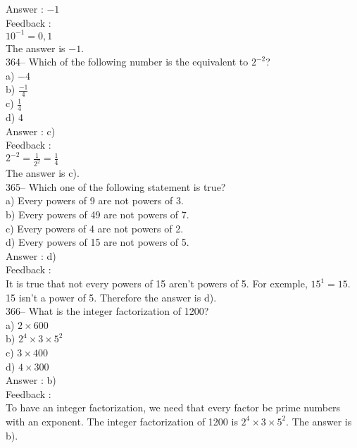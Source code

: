 \documentclass[letterpaper, 12pt]{article}
\begin{document}
Answer : $-1$\\

Feedback : \\
$10^{-1}=0,1$\\
The answer is $-1$.\\

364-- Which of the following number is the equivalent to $2^{-2}$?\\
a) $-4$\\[2mm]
b) $\frac{-1}{4}$\\[2mm]
c) $\frac{1}{4}$\\[2mm]
d) 4\\

Answer : c)\\

Feedback : \\
$2^{-2}=\frac{1}{2^{2}}=\frac{1}{4}$\\[2mm]
The answer is c).\\

365-- Which one of the following statement is true?\\
a) Every powers of 9 are not powers of 3.\\
b) Every powers of 49 are not powers of 7.\\
c) Every powers of 4 are not powers of 2.\\
d) Every powers of 15 are not powers of 5.\\

Answer : d)\\

Feedback : \\
It is true that not every powers of 15 aren't powers of 5.
  For exemple, $15^{1}=15$. 15 isn't a power of 5.  Therefore the answer is d).\\

366-- What is the integer factorization of 1200?\\
a) $2\times600$\\
b) $2^{4}\times3\times5^{2}$\\
c) $3\times 400$\\
d) $4\times300$\\

Answer : b)\\

Feedback : \\
To have an integer factorization, we need that every factor be prime numbers with an exponent. The integer factorization of 1200 is $2^{4}\times3\times5^{2}$.  The answer is b).\\
\end{document}
